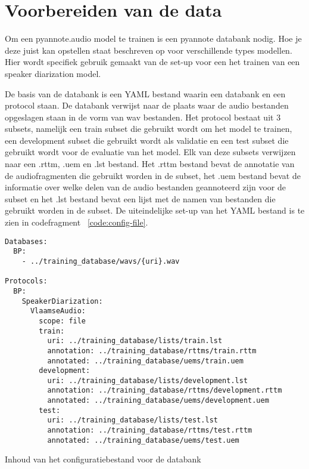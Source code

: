 \section{Voorbereiden van de data}
\label{sec:data}
Om een pyannote.audio model te trainen is een pyannote databank nodig. Hoe je deze juist kan opstellen staat beschreven op \textcite{BredinDatabase} voor verschillende types modellen. Hier wordt specifiek gebruik gemaakt van de set-up voor een het trainen van een speaker diarization model.

De basis van de databank is een YAML bestand waarin een databank en een protocol staan. De databank verwijst naar de plaats waar de audio bestanden opgeslagen staan in de vorm van wav bestanden. Het protocol bestaat uit 3 subsets, namelijk een train subset die gebruikt wordt om het model te trainen, een development subset die gebruikt wordt als validatie en een test subset die gebruikt wordt voor de evaluatie van het model. Elk van deze subsets verwijzen naar een .rttm, .uem en .lst bestand. Het .rttm bestand bevat de annotatie van de audiofragmenten die gebruikt worden in de subset, het .uem bestand bevat de informatie over welke delen van de audio bestanden geannoteerd zijn voor de subset en het .lst bestand bevat een lijst met de namen van bestanden die gebruikt worden in de subset. De uiteindelijke set-up van het YAML bestand is te zien in codefragment ~\ref{code:config-file}.

\begin{listing}
    \begin{verbatim}
Databases:
  BP: 
    - ../training_database/wavs/{uri}.wav

Protocols:
  BP:
    SpeakerDiarization:
      VlaamseAudio:
        scope: file
        train:
          uri: ../training_database/lists/train.lst
          annotation: ../training_database/rttms/train.rttm
          annotated: ../training_database/uems/train.uem
        development:
          uri: ../training_database/lists/development.lst
          annotation: ../training_database/rttms/development.rttm
          annotated: ../training_database/uems/development.uem
        test:
          uri: ../training_database/lists/test.lst
          annotation: ../training_database/rttms/test.rttm
          annotated: ../training_database/uems/test.uem
    \end{verbatim}
	\caption[Configuratie databank]{\label{code:config-file}Inhoud van het configuratiebestand voor de databank}
\end{listing}


